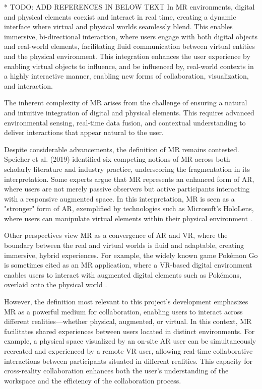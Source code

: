     * TODO: ADD REFERENCES IN BELOW TEXT
    In \ac{MR} environments, digital and physical elements coexist and interact in real time, creating a dynamic interface where virtual and physical worlds seamlessly blend. This enables immersive, bi-directional interaction, where users engage with both digital objects and real-world elements, facilitating fluid communication between virtual entities and the physical environment. This integration enhances the user experience by enabling virtual objects to influence, and be influenced by, real-world contexts in a highly interactive manner, enabling new forms of collaboration, visualization, and interaction.

    The inherent complexity of \ac{MR} arises from the challenge of ensuring a natural and intuitive integration of digital and physical elements. This requires advanced environmental sensing, real-time data fusion, and contextual understanding to deliver interactions that appear natural to the user. 

    Despite considerable advancements, the definition of \ac{MR} remains contested. Speicher et al. (2019) identified six competing notions of \ac{MR} across both scholarly literature and industry practice, underscoring the fragmentation in its interpretation. Some experts argue that \ac{MR} represents an enhanced form of \ac{AR}, where users are not merely passive observers but active participants interacting with a responsive augmented space. In this interpretation, \ac{MR} is seen as a "stronger" form of \ac{AR}, exemplified by technologies such as Microsoft's HoloLens, where users can manipulate virtual elements within their physical environment \cite{whatismixedreality}.

    Other perspectives view \ac{MR} as a convergence of \ac{AR} and \ac{VR}, where the boundary between the real and virtual worlds is fluid and adaptable, creating immersive, hybrid experiences. For example, the widely known game Pokémon Go is sometimes cited as an \ac{MR} application, where a \ac{VR}-based digital environment enables users to interact with augmented digital elements such as Pokémons, overlaid onto the physical world \cite{whatismixedreality}.

    However, the definition most relevant to this project's development emphasizes \ac{MR} as a powerful medium for collaboration, enabling users to interact across different realities—whether physical, augmented, or virtual. In this context, \ac{MR} facilitates shared experiences between users located in distinct environments. For example, a physical space visualized by an on-site \ac{AR} user can be simultaneously recreated and experienced by a remote \ac{VR} user, allowing real-time collaborative interactions between participants situated in different realities. This capacity for cross-reality collaboration enhances both the user’s understanding of the workspace and the efficiency of the collaboration process.

